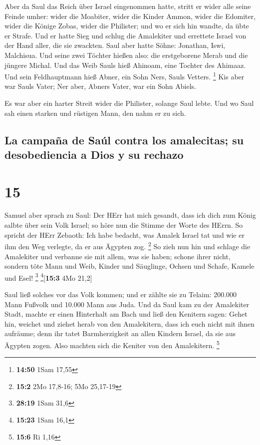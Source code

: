  Aber da Saul das Reich über Israel eingenommen hatte,
stritt er wider alle seine Feinde umher: wider die Moabiter, wider die
Kinder Ammon, wider die Edomiter, wider die Könige Zobas, wider die
Philister; und wo er sich hin wandte, da übte er Strafe. 
Und er hatte Sieg und schlug die Amalekiter und errettete Israel von der
Hand aller, die sie zwackten.  Saul aber hatte Söhne:
Jonathan, Iswi, Malchisua. Und seine zwei Töchter hießen also: die
erstgeborene Merab und die jüngere Michal.  Und das Weib
Sauls hieß Ahinoam, eine Tochter des Ahimaaz. Und sein Feldhauptmann
hieß Abner, ein Sohn Ners, Sauls Vetters. \footnote{\textbf{14:50} 1Sam
  17,55}  Kis aber war Sauls Vater; Ner aber, Abners
Vater, war ein Sohn Abiels.

 Es war aber ein harter Streit wider die Philister,
solange Saul lebte. Und wo Saul sah einen starken und rüstigen Mann, den
nahm er zu sich.

\hypertarget{la-campauxf1a-de-sauxfal-contra-los-amalecitas-su-desobediencia-a-dios-y-su-rechazo}{%
\subsection{La campaña de Saúl contra los amalecitas; su desobediencia a
Dios y su
rechazo}\label{la-campauxf1a-de-sauxfal-contra-los-amalecitas-su-desobediencia-a-dios-y-su-rechazo}}

\hypertarget{section-14}{%
\section{15}\label{section-14}}

 Samuel aber sprach zu Saul: Der HErr hat mich gesandt,
dass ich dich zum König salbte über sein Volk Israel; so höre nun die
Stimme der Worte des HErrn.  So spricht der HErr Zebaoth:
Ich habe bedacht, was Amalek Israel tat und wie er ihm den Weg verlegte,
da er aus Ägypten zog. \footnote{\textbf{15:2} 2Mo 17,8-16; 5Mo 25,17-19}
 So zieh nun hin und schlage die Amalekiter und verbanne
sie mit allem, was sie haben; schone ihrer nicht, sondern töte Mann und
Weib, Kinder und Säuglinge, Ochsen und Schafe, Kamele und Esel!
\footnote{\textbf{28:19} 1Sam 31,6} \footnote{\textbf{15:23} 1Sam 16,1}{[}\textbf{15:3}
4Mo 21,2{]}

 Saul ließ solches vor das Volk kommen; und er zählte sie
zu Telaim: 200.000 Mann Fußvolk und 10.000 Mann aus Juda. 
Und da Saul kam zu der Amalekiter Stadt, machte er einen Hinterhalt am
Bach  und ließ den Kenitern sagen: Gehet hin, weichet und
ziehet herab von den Amalekitern, dass ich euch nicht mit ihnen
aufräume; denn ihr tatet Barmherzigkeit an allen Kindern Israel, da sie
aus Ägypten zogen. Also machten sich die Keniter von den Amalekitern.
\footnote{\textbf{15:6} Ri 1,16}

